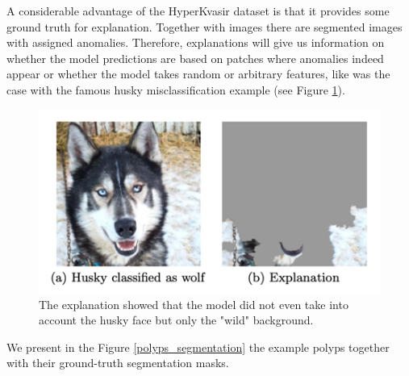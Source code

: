 \documentclass[magisterska,en]{pracamgr}
\begin{document}
A considerable advantage of the HyperKvasir dataset is that it provides some ground truth for explanation. Together with images there are segmented images with assigned anomalies. Therefore, explanations will give us information on whether the model predictions are based on patches where anomalies indeed appear or whether the model takes random or arbitrary features, like was the case with the famous husky misclassification example (see Figure \ref{husky}).

\begin{figure}[H]
\centering
\includegraphics[scale=0.5]{./images/husky.png}
\caption{The explanation showed that the model did not even take into account the husky face but only the "wild" background.}
\label{husky}
\end{figure}


We present in the Figure \ref{polyps_segmentation} the example polyps together with their ground-truth segmentation masks.
\end{document}
